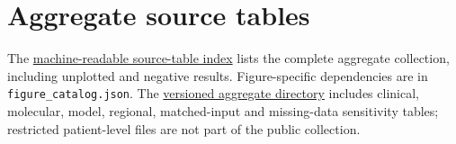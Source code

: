\documentclass[10pt,a4paper]{article}
\begin{document}
\clearpage\section*{Aggregate source tables}
The \href{run:source_data/index.csv}{machine-readable source-table index} lists the complete aggregate collection, including unplotted and negative results. Figure-specific dependencies are in \texttt{figure\_catalog.json}. The \href{https://github.com/yanax726/T2T/tree/main/results/tables}{versioned aggregate directory} includes clinical, molecular, model, regional, matched-input and missing-data sensitivity tables; restricted patient-level files are not part of the public collection.
{\small\setlength{\bibsep}{2pt}}
\end{document}
